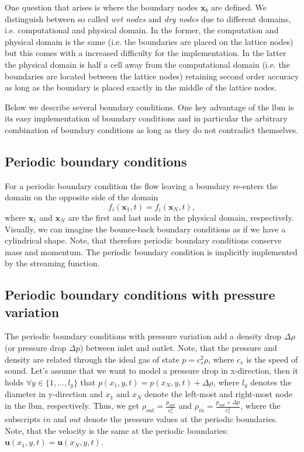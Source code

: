 \documentclass[a4paper,11pt, footsepline]{book}
\begin{document}
One question that arises is where the boundary nodes $\mathbf{x}_b$ are defined. We distinguish between so called \textit{wet nodes} and \textit{dry nodes} due to different domains, i.e. computational and physical domain. In the former, the computation and physical domain is the same (i.e. the boundaries are placed on the lattice nodes) but this comes with a increased difficulty for the implementation. In the latter the physical domain is half a cell away from the computational domain (i.e. the boundaries are located between the lattice nodes) retaining second order accuracy as long as the boundary is placed exactly in the middle of the lattice nodes.

Below we describe several boundary conditions. One key advantage of the \ac{lbm} is its easy implementation of boundary conditions and in particular the arbitrary combination of boundary conditions as long as they do not contradict themselves.
\subsection*{Periodic boundary conditions}
For a periodic boundary condition the flow leaving a boundary re-enters the domain on the opposite side of the domain
\begin{equation}
f_{i}(\mathbf{x}_{1},t)=f_{i}(\mathbf{x}_{N},t),
\end{equation}
where $\mathbf{x}_{1}$ and $\mathbf{x}_{N}$ are the first and last node in the physical domain, respectively. Visually, we can imagine the bounce-back boundary conditions as if we have a cylindrical shape. Note, that therefore periodic boundary conditions conserve mass and momentum.
The periodic boundary condition is implicitly implemented by the streaming function.
\subsection*{Periodic boundary conditions with pressure variation}
The periodic boundary conditions with pressure variation add a density drop $\Delta\rho$ (or pressure drop $\Delta p$) between inlet and outlet. Note, that the pressure and density are related through the ideal gas of state $p=c_{s}^2\rho$, where $c_{s}$ is the speed of sound. \cite{CLAPEYRON.}
Let's assume that we want to model a pressure drop in x-direction, then it holds $\forall y\in\lbrace 1,...,l_{y}\rbrace$ that $p(x_{1},y,t)=p(x_{N},y,t)+\Delta\rho$, where $l_{y}$ denotes the diameter in y-direction and $x_1$ and $x_{N}$ denote the left-most and right-most node in the \ac{lbm}, respectively. Thus, we get $\rho_{out}=\frac{p_{out}}{c_{s}^2}$ and $\rho_{in}=\frac{p_{out}+\Delta p}{c_{s}^2}$, where the subscripts $in$ and $out$ denote the pressure values at the periodic boundaries.
Note, that the velocity is the same at the periodic boundaries: $\mathbf{u}(x_{1},y,t)=\mathbf{u}(x_{N},y,t)$.
\end{document}
